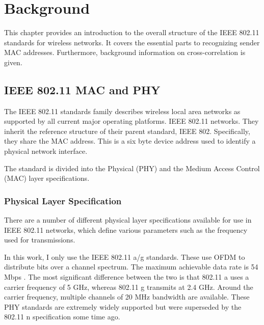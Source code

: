 
\chapter{Background}\label{ch:relatedwork}
\glsresetall %
 

This chapter provides an introduction to the overall structure of the \gls{IEEE} 802.11 standards for wireless networks. It covers the essential parts to recognizing sender \gls{MAC} addresses. Furthermore, background information on cross-correlation is given.



\section{IEEE 802.11 MAC and PHY} \label{sec:mac-and-phy}

The \gls{IEEE} 802.11 standards family describes wireless local area networks as supported by all current major operating platforms. \gls{IEEE} 802.11 networks. They inherit the reference structure of their parent standard, \gls{IEEE} 802. Specifically, they share the \gls{MAC} address. This is a six byte device address used to identify a physical network interface.

The standard is divided into the Physical (PHY) and the Medium Access Control (MAC) layer specifications.


\subsection{Physical Layer Specification}

There are a number of different physical layer specifications available for use in \gls{IEEE} 802.11 networks, which define various parameters such as the frequency used for transmissions.

In this work, I only use the \gls{IEEE} 802.11 a/g standards. These use \gls{OFDM} to distribute bits over a channel spectrum. The maximum achievable data rate is 54 \gls{Mbps} \cite{ieee2012}. The most significant difference between the two is that 802.11 a uses a carrier frequency of 5 GHz, whereas 802.11 g transmits at 2.4 GHz. Around the carrier frequency, multiple channels of 20 MHz bandwidth are available. These \gls{PHY} standards are extremely widely supported but were superseded by the 802.11 n specification some time ago.

